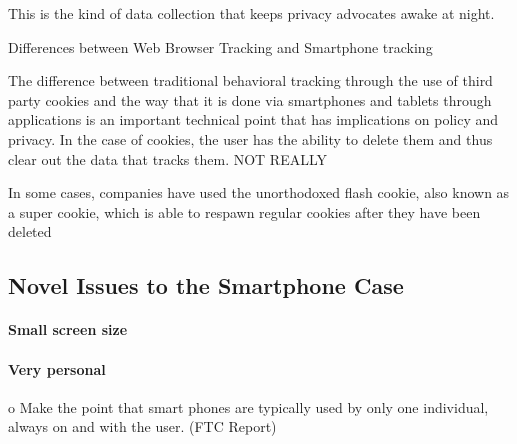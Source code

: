This is the kind of data collection that keeps privacy advocates awake at night. 

Differences between Web Browser Tracking and Smartphone tracking

The difference between traditional behavioral tracking through the use of third party cookies and the way that it is done via smartphones and tablets through applications is an important technical point that has implications on policy and privacy. In the case of cookies, the user has the ability to delete them and thus clear out the data that tracks them. NOT REALLY

In some cases, companies have used the unorthodoxed flash cookie, also known as a super cookie, which is able to respawn regular cookies after they have been deleted


	\subsection{Novel Issues to the Smartphone Case}

		\paragraph{Small screen size} %

		\paragraph{Very personal}     %

o Make the point that smart phones are typically used by only one individual, always on and with the user. (FTC Report)





